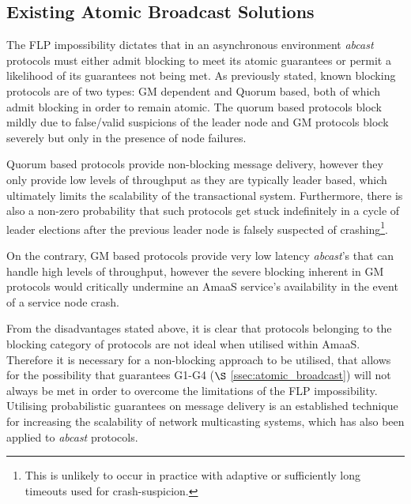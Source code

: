     \subsection{Existing Atomic Broadcast Solutions}
    The FLP impossibility \citep{Fischer:1985:IDC:3149.214121} dictates that in an asynchronous environment \emph{abcast} protocols must either admit blocking to meet its atomic guarantees or permit a likelihood of its guarantees not being met.  As  previously stated, known blocking protocols are of two types: GM dependent and Quorum based, both of which admit blocking in order to remain atomic.  The quorum based protocols block mildly due to false/valid suspicions of the leader node and GM protocols block severely but only in the presence of node failures.  
    
    Quorum based protocols provide non-blocking message delivery, however they only provide low levels of throughput as they are typically leader based, which ultimately limits the scalability of the transactional system.  Furthermore, there is also a non-zero probability that such protocols get stuck indefinitely in a cycle of leader elections after the previous leader node is falsely suspected of crashing\footnote{This is unlikely to occur in practice with adaptive or sufficiently long timeouts used for crash-suspicion.}.  
    
    On the contrary, GM based protocols provide very low latency \emph{abcast}'s that can handle high levels of throughput, however the severe blocking inherent in GM protocols would critically undermine an \textsf{AmaaS} service's availability in the event of a service node crash.  
    
    From the disadvantages stated above, it is clear that protocols belonging to the blocking category of protocols are not ideal when utilised within \textsf{AmaaS}.  Therefore it is necessary for a non-blocking approach to be utilised, that allows for the possibility that guarantees G1-G4 ($\S$ \ref{ssec:atomic_broadcast}) will not always be met in order to overcome the limitations of the FLP impossibility.  Utilising probabilistic guarantees on message delivery is an established technique for increasing the scalability of network multicasting systems\citep{Kermarrec:2003:PRD:766617.766623}, which has also been applied to \emph{abcast} protocols.  
    
